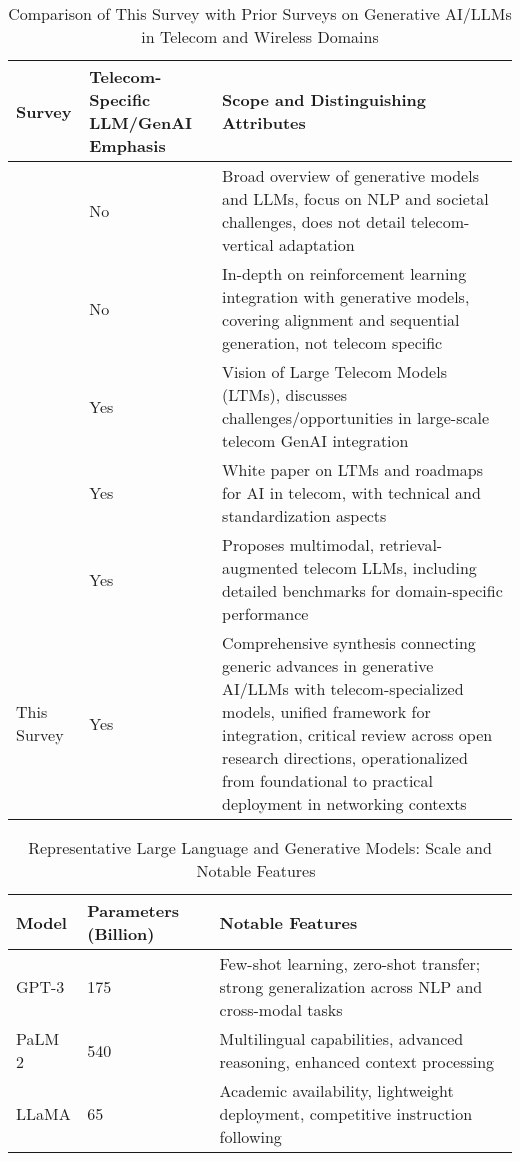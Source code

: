 \documentclass[sigconf]{acmart}
\begin{document}
\begin{table*}[htbp]
\centering
\caption{Comparison of This Survey with Prior Surveys on Generative AI/LLMs in Telecom and Wireless Domains}
\label{tab:survey_comparison}
\begin{adjustbox}{max width=\textwidth}
\begin{tabular}{@{}lll@{}}
\toprule
\textbf{Survey} & \textbf{Telecom-Specific LLM/GenAI Emphasis} & \textbf{Scope and Distinguishing Attributes} \\
\midrule
\cite{ref7} & No & Broad overview of generative models and LLMs, focus on NLP and societal challenges, does not detail telecom-vertical adaptation \\
\cite{ref1} & No & In-depth on reinforcement learning integration with generative models, covering alignment and sequential generation, not telecom specific \\
\cite{ref26} & Yes & Vision of Large Telecom Models (LTMs), discusses challenges/opportunities in large-scale telecom GenAI integration \\
\cite{ref33} & Yes & White paper on LTMs and roadmaps for AI in telecom, with technical and standardization aspects \\
\cite{ref21} & Yes & Proposes multimodal, retrieval-augmented telecom LLMs, including detailed benchmarks for domain-specific performance \\
This Survey & Yes & Comprehensive synthesis connecting generic advances in generative AI/LLMs with telecom-specialized models, unified framework for integration, critical review across open research directions, operationalized from foundational to practical deployment in networking contexts \\
\bottomrule
\end{tabular}
\end{adjustbox}
\end{table*}

\begin{table*}[htbp]
\centering
\caption{Representative Large Language and Generative Models: Scale and Notable Features~\cite{ref7}}
\label{tab:llm_models}
\begin{adjustbox}{max width=\textwidth}
\begin{tabular}{@{}lll@{}}
\toprule
\textbf{Model} & \textbf{Parameters (Billion)} & \textbf{Notable Features} \\
\midrule
GPT-3 & 175 & Few-shot learning, zero-shot transfer; strong generalization across NLP and cross-modal tasks \\
PaLM 2 & 540 & Multilingual capabilities, advanced reasoning, enhanced context processing \\
LLaMA & 65 & Academic availability, lightweight deployment, competitive instruction following \\
\bottomrule
\end{tabular}
\end{adjustbox}
\end{table*}
\end{document}
